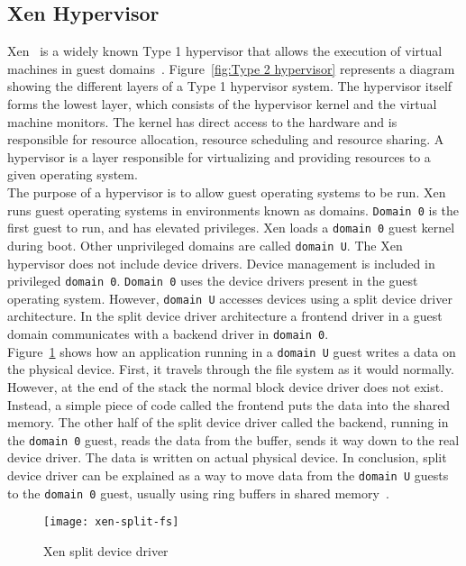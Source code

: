 \subsection{Xen Hypervisor}
Xen~\cite{Barham:2003:XAV:1165389.945462} is a widely known Type 1 hypervisor that allows the execution of virtual machines in guest domains~\cite{King_operatingsystem}. Figure~\ref{fig:Type 2 hypervisor} represents a diagram showing the different layers of a Type 1 hypervisor system. The hypervisor itself forms the lowest layer, which consists of the hypervisor kernel and the virtual machine monitors. The kernel has direct access to the hardware and is responsible for resource allocation, resource scheduling and resource sharing. A hypervisor is a layer responsible for virtualizing and providing resources to a given operating system.
\\[3mm]
The purpose of a hypervisor is to allow guest operating systems to be run. Xen runs guest operating systems in environments known as domains. \texttt{Domain 0} is the first guest to run, and has elevated privileges. Xen loads a \texttt{domain 0} guest kernel during boot. Other unprivileged domains are called \texttt{domain U}. The Xen hypervisor does not include device drivers. Device management is included in privileged \texttt{domain 0}. \texttt{Domain 0} uses the device drivers present in the guest operating system. However, \texttt{domain U} accesses devices using a split device driver architecture. In the split device driver architecture a frontend driver in a guest domain communicates with a backend driver in \texttt{domain 0}.
\\
Figure~\ref{xen-split2} shows how an application running in a \texttt{domain U} guest writes a data on the physical device. First, it travels through the file system as it would normally. However, at the end of the stack the normal block device driver does not exist. Instead, a simple piece of code called the frontend puts the data into the shared memory. The other half of the split device driver called the backend, running in the \texttt{domain 0} guest, reads the data from the buffer, sends it way down to the real device driver. The data is written on actual physical device. In conclusion, split device driver can be explained as a way to move data from the \texttt{domain U} guests to the \texttt{domain 0} guest, usually using ring buffers in shared memory~\cite{Chisnall:2007:DGX:1407351}.
\begin{figure}[!h]
\centering
\texttt{[image: xen-split-fs]}
\caption{Xen split device driver}
\label{xen-split2}
\end{figure}
